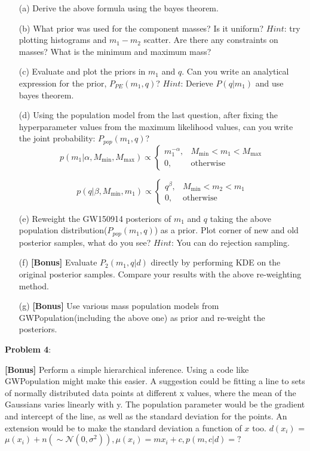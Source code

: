 \documentclass{article} %
\newcommand{\question}[2][]{\begin{flushleft}
        \textbf{Problem #1}: %
\end{flushleft}
}
\begin{document}
\begin{enumerate}
 	\item[(a)] Derive the above formula using the bayes theorem. 
	\item[(b)] What prior was used for the component masses? Is it uniform? $Hint$: try plotting histograms and $m_1-m_2$ scatter. Are there any constraints on masses? What is the minimum and maximum mass? 
	\item[(c)] Evaluate and plot the priors in $m_1$ and $q$. Can you write an analytical expression for the prior, $P_{PE}(m_1,q)$? $Hint$: Derieve $P(q|m_1)$ and use bayes theorem.
	\item[(d)] Using the population model from the last question, after fixing the hyperparameter values from the maximum likelihood values, can you write the joint probability: $P_{pop}(m_1,q)$? \\ 
\begin{equation}
  p(m_1|\alpha, M_\mathrm{min}, M_\mathrm{max}) \propto \begin{cases} m_1 ^ {-\alpha}, & M_\mathrm{min} < m_1 < M_\mathrm{max} \\ 0, & \mathrm{otherwise}\end{cases}  
\end{equation}

\begin{equation}
    p(q|\beta, M_\mathrm{min}, m_1) \propto \begin{cases}
q ^ {\beta},  & M_\mathrm{min} < m_2 < m_1 \\ 
0, & \mathrm{otherwise}
\end{cases}
\end{equation}


\item[(e)]Reweight the GW150914 posteriors of $m_1$ and $q$ taking the above population distribution($P_{pop}(m_1,q)$) as a prior. Plot corner of new and old posterior samples, what do you see? $Hint$: You can do rejection sampling.

\item[(f)]\textbf{[Bonus]} Evaluate $P_2(m_1,q|d)$ directly by performing KDE on the original posterior samples. Compare your results with the above re-weighting method.

\item[(g)]\textbf{[Bonus]} Use various mass population models from GWPopulation(including the above one) as prior and re-weight the posteriors.

        
    \end{enumerate}
    
    \question[4]{} \textbf{[Bonus]}
    Perform a simple hierarchical inference. Using a code like GWPopulation might make this easier. A suggestion could be fitting a line to sets of normally distributed data points at different x values, where the mean of the Gaussians varies linearly with y. The population parameter would be the gradient and intercept of the line, as well as the standard deviation for the points. An extension would be to make the standard deviation a function of $x$ too. $d(x_i)$ = $\mu(x_i) + n( \sim \mathcal{N}(0, \sigma^2)) , \mu(x_i) = m x_i + c,   p(m,c|d)=?$
\end{document}
